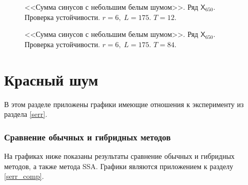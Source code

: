 \documentclass[specialist,
               substylefile = spbu.rtx,
               subf,href,colorlinks=true, 12p]{disser}
\begin{document}
\begin{figure}[h]
	\captionsetup{justification=centering}
	\caption{<<Сумма синусов с небольшим белым шумом>>. Ряд $\mathsf{X}_{650}$. Проверка устойчивости. $r = 6, \; L = 175$.  $T = 12$.}
	\label{edsine0.3r6.12}
\end{figure}

\begin{figure}[h]
	\captionsetup{justification=centering}
	\caption{<<Сумма синусов с небольшим белым шумом>>. Ряд $\mathsf{X}_{650}$. Проверка устойчивости. $r = 6, \; L = 175$. $T = 84$.}
	\label{edsine0.3r6.84}
\end{figure}

\clearpage

\section{Красный шум}
\label{aserr}
В этом разделе приложены графики имеющие отношения к эксперименту из раздела \ref{serr}.

\subsubsection{Сравнение обычных и гибридных методов}
\label{aserr_comp}
На графиках ниже показаны результаты сравнение обычных и гибридных методов, а также метода SSA. Графики являются приложением к разделу \ref{serr_comp}.
\end{document}
